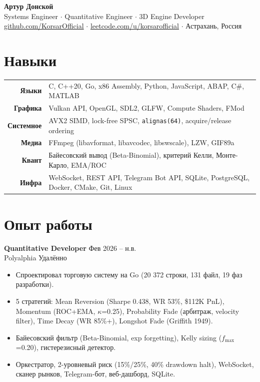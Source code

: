 \documentclass[10pt, a4paper]{article}
\newcommand{\entry}[4]{{\textbf{#1}} \hfill {\small\color{graytext}#2}\\{\small #3 \hfill #4}\vspace{2pt}}
\begin{document}
\begin{center}
{\LARGE\bfseries Артур Донской}\\[2pt]
{\normalsize Systems Engineer $\cdot$ Quantitative Engineer $\cdot$ 3D Engine Developer}\\[3pt]
{\small
\href{https://github.com/KorsarOfficial}{github.com/KorsarOfficial} $\cdot$
\href{https://leetcode.com/u/korsarofficial}{leetcode.com/u/korsarofficial} $\cdot$
Астрахань, Россия
}
\end{center}

\vspace{-2pt}

\section{Навыки}

\begin{tabularx}{\textwidth}{@{}r|X@{}}
\textbf{\small Языки} & C, C++20, Go, x86 Assembly, Python, JavaScript, ABAP, C\#, MATLAB \\
\textbf{\small Графика} & Vulkan API, OpenGL, SDL2, GLFW, Compute Shaders, FMod \\
\textbf{\small Системное} & AVX2 SIMD, lock-free SPSC, \texttt{alignas(64)}, acquire/release ordering \\
\textbf{\small Медиа} & FFmpeg (libavformat, libavcodec, libswscale), LZW, GIF89a \\
\textbf{\small Квант} & Байесовский вывод (Beta-Binomial), критерий Келли, Монте-Карло, EMA/ROC \\
\textbf{\small Инфра} & WebSocket, REST API, Telegram Bot API, SQLite, PostgreSQL, Docker, CMake, Git, Linux \\
\end{tabularx}

\vspace{-2pt}

\section{Опыт работы}

\entry{Quantitative Developer}{Фев 2026 -- н.в.}{Polyalphia}{Удалённо}
\begin{itemize}
\item Спроектировал торговую систему на Go (20 372 строки, 131 файл, 19 фаз разработки).
\item 5 стратегий: Mean Reversion (Sharpe 0.438, WR 53\%, \$112K PnL), Momentum (ROC+EMA, $\kappa$=0.25), Probability Fade (арбитраж, velocity filter), Time Decay (WR 85\%+), Longshot Fade (Griffith 1949).
\item Байесовский фильтр (Beta-Binomial, exp forgetting), Kelly sizing ($f_{\max}$=0.20), гистерезисный детектор.
\item Оркестратор, 2-уровневый риск (15\%/25\%, 40\% drawdown halt), WebSocket, сканер рынков, Telegram-бот, веб-дашборд, SQLite.
\end{itemize}
\end{document}
